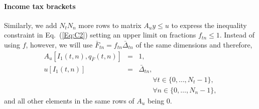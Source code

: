 \documentclass{report}[fleqn,11pt]
\begin{document}
\paragraph*{Income tax brackets}
Similarly, we add $N_t N_n$ more rows to matrix $A_uy \le u$ to express
the inequality constraint in Eq.~(\ref{Eq:C2})
setting an upper limit on fractions $f_{t n} \le 1$.
Instead of using $f$, however, we will use $\bar{F}_{tn} = f_{tn}\bar{\Delta}_{tn}$
of the same dimensions and therefore,
\begin{eqnarray}
	A_u[I_1(t, n), q_{\bar{F}}(t, n)] &=& 1, \nonumber \\
	u[I_1(t, n)] &=& \bar{\Delta}_{tn},\\
	&&\qquad\forall t \in \{0,\ldots, N_t - 1\}, \nonumber\\
	&&\qquad\forall n \in \{0,\ldots, N_n - 1\},\nonumber
\end{eqnarray}
and all other elements in the same rows of $A_u$ being $0$.
\end{document}
